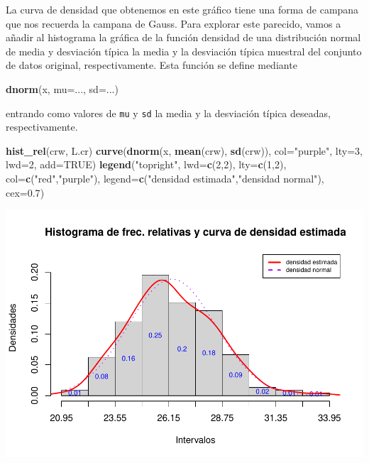 \documentclass[
]{book}
\newenvironment{Shaded}{\begin{snugshade}}{\end{snugshade}}
\newcommand{\DataTypeTok}[1]{\textcolor[rgb]{0.13,0.29,0.53}{#1}}
\newcommand{\DecValTok}[1]{\textcolor[rgb]{0.00,0.00,0.81}{#1}}
\newcommand{\FloatTok}[1]{\textcolor[rgb]{0.00,0.00,0.81}{#1}}
\newcommand{\KeywordTok}[1]{\textcolor[rgb]{0.13,0.29,0.53}{\textbf{#1}}}
\newcommand{\NormalTok}[1]{#1}
\newcommand{\OtherTok}[1]{\textcolor[rgb]{0.56,0.35,0.01}{#1}}
\newcommand{\StringTok}[1]{\textcolor[rgb]{0.31,0.60,0.02}{#1}}
\theoremstyle{definition}
\theoremstyle{definition}
\theoremstyle{definition}
\theoremstyle{remark}
\begin{document}
La curva de densidad que obtenemos en este gráfico tiene una forma de campana que nos recuerda la campana de Gauss. Para explorar este parecido, vamos a añadir al histograma la gráfica de la función densidad de una distribución normal de media y desviación típica la media y la desviación típica muestral del conjunto de datos original, respectivamente. Esta función se define mediante

\begin{Shaded}
\begin{Highlighting}[]
\KeywordTok{dnorm}\NormalTok{(x, }\DataTypeTok{mu=}\NormalTok{..., }\DataTypeTok{sd=}\NormalTok{...)}
\end{Highlighting}
\end{Shaded}

entrando como valores de \texttt{mu} y \texttt{sd} la media y la desviación típica deseadas, respectivamente.

\begin{Shaded}
\begin{Highlighting}[]
\KeywordTok{hist\_rel}\NormalTok{(crw, L.cr)}
\KeywordTok{curve}\NormalTok{(}\KeywordTok{dnorm}\NormalTok{(x, }\KeywordTok{mean}\NormalTok{(crw), }\KeywordTok{sd}\NormalTok{(crw)), }\DataTypeTok{col=}\StringTok{"purple"}\NormalTok{, }\DataTypeTok{lty=}\DecValTok{3}\NormalTok{, }\DataTypeTok{lwd=}\DecValTok{2}\NormalTok{, }\DataTypeTok{add=}\OtherTok{TRUE}\NormalTok{)}
\KeywordTok{legend}\NormalTok{(}\StringTok{"topright"}\NormalTok{, }\DataTypeTok{lwd=}\KeywordTok{c}\NormalTok{(}\DecValTok{2}\NormalTok{,}\DecValTok{2}\NormalTok{), }\DataTypeTok{lty=}\KeywordTok{c}\NormalTok{(}\DecValTok{1}\NormalTok{,}\DecValTok{2}\NormalTok{), }\DataTypeTok{col=}\KeywordTok{c}\NormalTok{(}\StringTok{"red"}\NormalTok{,}\StringTok{"purple"}\NormalTok{),}
  \DataTypeTok{legend=}\KeywordTok{c}\NormalTok{(}\StringTok{"densidad estimada"}\NormalTok{,}\StringTok{"densidad normal"}\NormalTok{), }\DataTypeTok{cex=}\FloatTok{0.7}\NormalTok{)}
\end{Highlighting}
\end{Shaded}

\begin{center}\includegraphics[width=0.9\linewidth]{13chap13_Agrupados_files/figure-latex/unnamed-chunk-95-1} \end{center}
\end{document}
